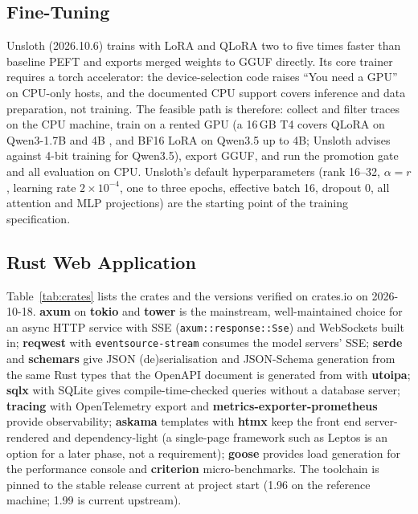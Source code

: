 \subsection{Fine-Tuning}
Unsloth (2026.10.6) trains with LoRA and QLoRA two to five times faster than
baseline PEFT and exports merged weights to GGUF directly. Its core trainer
requires a torch accelerator: the device-selection code raises ``You need a
GPU'' on CPU-only hosts, and the documented CPU support covers inference and
data preparation, not training. The feasible path is therefore: collect and
filter traces on the CPU machine, train on a rented GPU (a 16\,GB T4 covers
QLoRA on Qwen3-1.7B and 4B \cite{dettmers2023qlora,hu2022lora}, and BF16
LoRA on Qwen3.5 up to 4B; Unsloth advises against 4-bit training for
Qwen3.5), export GGUF, and run the promotion gate and all evaluation on CPU.
Unsloth's default hyperparameters (rank 16--32, $\alpha=r$, learning rate
$2\times10^{-4}$, one to three epochs, effective batch 16, dropout 0, all
attention and MLP projections) are the starting point of the training
specification.

\subsection{Rust Web Application}
Table~\ref{tab:crates} lists the crates and the versions verified on
crates.io on 2026-10-18. \textbf{axum} on \textbf{tokio} and \textbf{tower}
is the mainstream, well-maintained choice for an async HTTP service with
SSE (\texttt{axum::response::Sse}) and WebSockets built in;
\textbf{reqwest} with \texttt{eventsource-stream} consumes the model
servers' SSE; \textbf{serde} and \textbf{schemars} give JSON (de)serialisation
and JSON-Schema generation from the same Rust types that the OpenAPI document
is generated from with \textbf{utoipa}; \textbf{sqlx} with SQLite gives
compile-time-checked queries without a database server; \textbf{tracing}
with OpenTelemetry export and \textbf{metrics-exporter-prometheus} provide
observability; \textbf{askama} templates with \textbf{htmx} keep the
front end server-rendered and dependency-light (a single-page framework such
as Leptos is an option for a later phase, not a requirement); \textbf{goose}
provides load generation for the performance console and \textbf{criterion}
micro-benchmarks. The toolchain is pinned to the stable release current at
project start (1.96 on the reference machine; 1.99 is current upstream).

